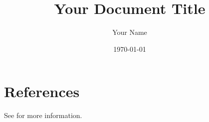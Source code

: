 \documentclass{article}
\title{Your Document Title}
\author{Your Name}
\date{\today}
\begin{document}
\maketitle



\section{References}

See \cite{example} for more information.



\end{document}
